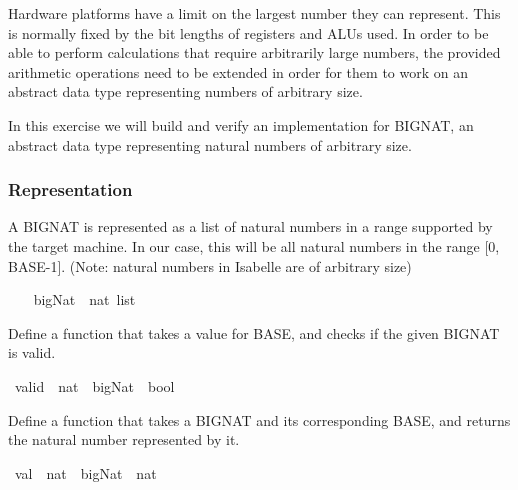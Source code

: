 %
\begin{isabellebody}%
\def\isabellecontext{a{\isadigit{5}}}%
\isamarkupfalse%
%
\isamarkuptrue%
%
\begin{isamarkuptext}%
Hardware platforms have a limit on the largest number they can represent. This is normally fixed by the bit lengths of registers and ALUs used. In order to be able to perform calculations that require arbitrarily large numbers, the provided arithmetic operations need to be extended in order for them to work on an abstract data type representing numbers of arbitrary size.

In this exercise we will build and verify an implementation for BIGNAT, an abstract data type representing natural numbers of arbitrary size.%
\end{isamarkuptext}%
\isamarkuptrue%
%
\begin{isamarkuptext}%
\subsubsection*{Representation}%
\end{isamarkuptext}%
\isamarkuptrue%
%
\begin{isamarkuptext}%
A BIGNAT is represented as a list of natural numbers in a range supported by the target machine. In our case, this will be all natural numbers in the range [0, BASE-1]. (Note: natural numbers in Isabelle are of arbitrary size)%
\end{isamarkuptext}%
\isamarkuptrue%
\ \isanewline
\ \ bigNat\ {\isacharequal}\ {\isachardoublequote}nat\ list{\isachardoublequote}\isamarkupfalse%
%
\begin{isamarkuptext}%
Define a function  that takes a value for BASE, and checks if the given BIGNAT is valid.%
\end{isamarkuptext}%
\isamarkuptrue%
\ valid\ {\isacharcolon}{\isacharcolon}\ {\isachardoublequote}nat\ {\isasymRightarrow}\ bigNat\ {\isasymRightarrow}\ bool{\isachardoublequote}\isamarkupfalse%
%
\begin{isamarkuptext}%
Define a function  that takes a BIGNAT and its corresponding BASE, and returns the natural number represented by it.%
\end{isamarkuptext}%
\isamarkuptrue%
\ val\ {\isacharcolon}{\isacharcolon}\ {\isachardoublequote}nat\ {\isasymRightarrow}\ bigNat\ {\isasymRightarrow}\ nat{\isachardoublequote}\isamarkupfalse%
%
\begin{isamarkuptext}%

\end{isamarkuptext}
\end{isabellebody}
